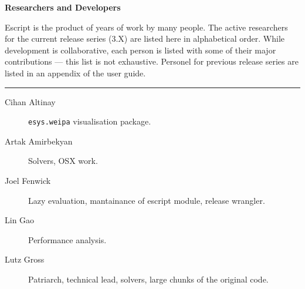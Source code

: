 \vbox{}
\vfill
\begin{center}
\textbf{\Large Researchers and Developers}
\vspace{0.5cm}

Escript is the product of years of work by many people.
The active researchers for the current release series (3.X) are listed here in alphabetical order.
While development is collaborative, each person is listed with some of their major contributions --- this list is not exhaustive.
Personel for previous release series are listed in an appendix of the user guide.

\vspace{1cm}
\hrule
\vspace{1cm}
\begin{description}
\item[Cihan Altinay] \texttt{esys.weipa} visualisation package.
\item[Artak Amirbekyan] Solvers, OSX work.
\item[Joel Fenwick] Lazy evaluation, mantainance of escript module, release wrangler.
\item[Lin Gao] Performance analysis.
\item[Lutz Gross] Patriarch, technical lead, solvers, large chunks of the original code.
\end{description}
\end{center}
\vfill
\pagebreak